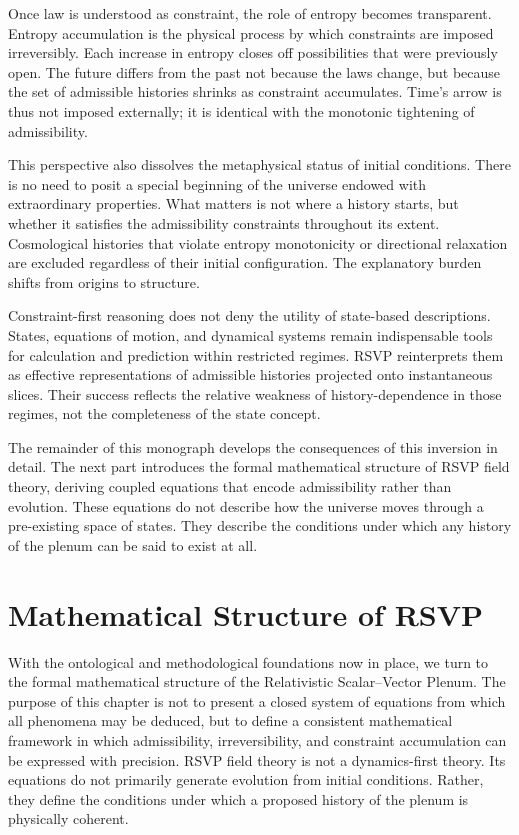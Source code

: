 \documentclass[11pt,oneside]{book}
\begin{document}
Once law is understood as constraint, the role of entropy becomes transparent. Entropy accumulation is the physical process by which constraints are imposed irreversibly. Each increase in entropy closes off possibilities that were previously open. The future differs from the past not because the laws change, but because the set of admissible histories shrinks as constraint accumulates. Time’s arrow is thus not imposed externally; it is identical with the monotonic tightening of admissibility.

This perspective also dissolves the metaphysical status of initial conditions. There is no need to posit a special beginning of the universe endowed with extraordinary properties. What matters is not where a history starts, but whether it satisfies the admissibility constraints throughout its extent. Cosmological histories that violate entropy monotonicity or directional relaxation are excluded regardless of their initial configuration. The explanatory burden shifts from origins to structure.

Constraint-first reasoning does not deny the utility of state-based descriptions. States, equations of motion, and dynamical systems remain indispensable tools for calculation and prediction within restricted regimes. RSVP reinterprets them as effective representations of admissible histories projected onto instantaneous slices. Their success reflects the relative weakness of history-dependence in those regimes, not the completeness of the state concept.

The remainder of this monograph develops the consequences of this inversion in detail. The next part introduces the formal mathematical structure of RSVP field theory, deriving coupled equations that encode admissibility rather than evolution. These equations do not describe how the universe moves through a pre-existing space of states. They describe the conditions under which any history of the plenum can be said to exist at all.

\chapter{Mathematical Structure of RSVP}

With the ontological and methodological foundations now in place, we turn to the formal mathematical structure of the Relativistic Scalar--Vector Plenum. The purpose of this chapter is not to present a closed system of equations from which all phenomena may be deduced, but to define a consistent mathematical framework in which admissibility, irreversibility, and constraint accumulation can be expressed with precision. RSVP field theory is not a dynamics-first theory. Its equations do not primarily generate evolution from initial conditions. Rather, they define the conditions under which a proposed history of the plenum is physically coherent.
\end{document}
